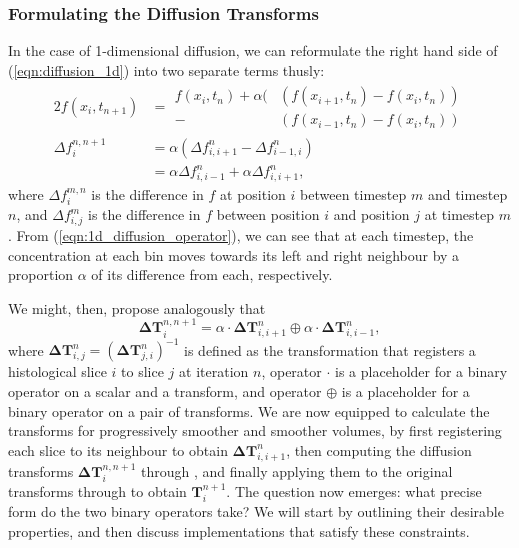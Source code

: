     \subsubsection{Formulating the Diffusion Transforms} %
    \label{ssub:formulating_the_diffusion_transforms}
      In the case of 1-dimensional diffusion, we can reformulate the right hand side of (\ref{eqn:diffusion_1d}) into two separate terms thusly:
	  \begin{alignat}{2}
  	  f(x_i, t_{n+1}) &=\begin{aligned}
        f(x_i, t_n) + \alpha (&(f(x_{i+1}, t_n) - f(x_i, t_n)) \\
                                    - &(f(x_{i-1}, t_n) - f(x_i, t_n))
  	  \end{aligned} \\
      \Delta f_i^{n,n+1} &= \alpha (\Delta f_{i,i+1}^n - \Delta f_{i-1,i}^n) \\
                         &= \alpha \Delta f_{i,i-1}^n + \alpha \Delta f_{i,i+1}^n, \label{eqn:1d_diffusion_operator}
		\end{alignat}
    where $\Delta f_i^{m,n}$ is the difference in $f$ at position $i$ between timestep $m$ and timestep $n$, and $\Delta f_{i,j}^m$ is the difference in $f$ between position $i$ and position $j$ at timestep $m$. From (\ref{eqn:1d_diffusion_operator}), we can see that at each timestep, the concentration at each bin moves towards its left and right neighbour by a proportion $\alpha$ of its difference from each, respectively.
		
	  We might, then, propose analogously that
		\begin{equation}
		 	\mathbf{\Delta T}_i^{n,n+1} = \alpha \cdot \mathbf{\Delta T}_{i,i+1}^n \oplus \alpha \cdot \mathbf{\Delta T}_{i,i-1}^n, \label{eqn:transformational_placeholder}
		\end{equation}
	 	where $\mathbf{\Delta T}_{i,j}^n = (\mathbf{\Delta T}_{j,i}^n)^{-1}$ is defined as the transformation that registers a histological slice $i$ to slice $j$ at iteration $n$, operator $\cdot$ is a placeholder for a binary operator on a scalar and a transform, and operator $\oplus$ is a placeholder for a binary operator on a pair of transforms. We are now equipped to calculate the transforms for progressively smoother and smoother volumes, by first registering each slice to its neighbour to obtain $\mathbf{\Delta T}_{i,i+1}^n$, then computing the diffusion transforms $\mathbf{\Delta T}_i^{n,n+1}$ through , and finally applying them to the original transforms through  to obtain $\mathbf{T}_i^{n+1}$. The question now emerges: what precise form do the two binary operators take? We will start by outlining their desirable properties, and then discuss implementations that satisfy these constraints.
		

